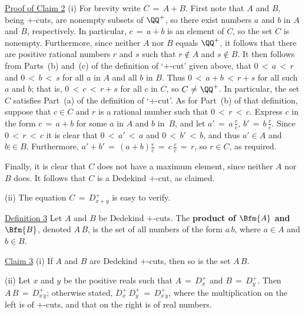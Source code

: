 {        \underline{Proof of Claim 2} (i) For brevity write $C \,=\, A+B$. First note that $A$ and $B$, being $+$-cuts,
    are nonempty subsets of ${\QQ}^{+}$, so there exist numbers $a$ and $b$ in $A$ and $B$, respectively.
    In particular, $c \,=\, a+b$ is an element of $C$, so the set $C$ is nonempty.
    Furthermore, since neither $A$ nor $B$ equals ${\QQ}^{+}$, it follows that there are positive rational numbers $r$ and $s$ such that $r \not \in A$ and $s \not \in B$.
    It then follows from Parts~(b) and~(c) of the definition of `$+$-cut' given above, that $0\,<\,a\,<\,r$ and $0\,<\,b\,<\,s$ for all $a$ in $A$ and all $b$ in $B$.
    Thus $0\,<\,a+b\,<\,r+s$ for all such $a$ and $b$; that is, $0\,<\,c\,<\,r+s$ for all $c$ in $C$, so $C \,\,{\neq}\,\, {\QQ}^{+}$.
    In particular, the set $C$ satisfies Part~(a) of the definition of `$+$-cut'. As for Part~(b) of that definition,
    suppose that $c{\in}C$ and $r$ is a rational number such that $0\,<\,r\,<\,c$.
    Express $c$ in the form $c \,=\, a+b$ for some $a$ in $A$ and $b$ in~$B$, and let $a' \,=\, {\displaystyle a\,\frac{r}{c}}$, ${\displaystyle b' \,=\, b\,\frac{r}{c}}$.
    Since $0\,<\,r\,<\,c$ it is clear that $0\,<\,a'\,<\,a$ and $0\,<\,b'\,<\,b$, and thus $a'{\in}A$ and $b{\vdots}{\in}B$.
    Furthermore, $a'+b' \,=\, {\displaystyle (a+b)\frac{r}{c} \,=\, c\,\frac{r}{c} \,=\, r}$, so $r{\in}C$, as required.
    
    Finally, it is clear that $C$ does not have a maximum element, since neither $A$ nor $B$ does. It follows that $C$ is a Dedekind $+$-cut, as claimed.

        (ii) The equation $C \,=\, D_{x+y}^{+}$ is easy to verify.

\V


        \underline{Definition 3} Let $A$ and $B$ be Dedekind $+$-cuts.
    The {\bf product of $\Bfm{A}$ and $\Bfm{B}$},
    denoted $A\,B$, is the set of all numbers of the form $a\,b$, where $a{\in}A$ and $b{\in}B$.

        \underline{Claim 3} (i) If $A$ and $B$ are Dedekind $+$-cuts, then so is the set $A\,B$.

        (ii) Let $x$ and $y$ be the positive reals such that $A \,=\, D_{x}^{+}$ and $B \,=\, D_{y}^{+}$. Then $A\,B \,=\, D_{x\,y}^{+}$; otherwise stated, 
    $D_{x}^{+}\,D_{y}^{+} \,=\, D_{x\,y}^{+}$, where the multiplication on the left is of $+$-cuts, and that on the right is of real numbers.

\VA

}
